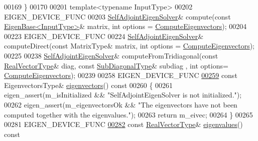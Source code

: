 \begin{DoxyCode}
00169     \}
00170 
00201     \textcolor{keyword}{template}<\textcolor{keyword}{typename} InputType>
00202     EIGEN\_DEVICE\_FUNC
00203     \hyperlink{group___eigenvalues___module_class_eigen_1_1_self_adjoint_eigen_solver}{SelfAdjointEigenSolver}& compute(\textcolor{keyword}{const} 
      \hyperlink{group___core___module_struct_eigen_1_1_eigen_base}{EigenBase<InputType>}& matrix, \textcolor{keywordtype}{int} options = 
      \hyperlink{group__enums_ggae3e239fb70022eb8747994cf5d68b4a9ada93d8885bde32b876ba4af01d3292cc}{ComputeEigenvectors});
00204     
00223     EIGEN\_DEVICE\_FUNC
00224     \hyperlink{group___eigenvalues___module_class_eigen_1_1_self_adjoint_eigen_solver}{SelfAdjointEigenSolver}& computeDirect(\textcolor{keyword}{const} MatrixType& matrix, \textcolor{keywordtype}{int} options = 
      \hyperlink{group__enums_ggae3e239fb70022eb8747994cf5d68b4a9ada93d8885bde32b876ba4af01d3292cc}{ComputeEigenvectors});
00225 
00238     \hyperlink{group___eigenvalues___module_class_eigen_1_1_self_adjoint_eigen_solver}{SelfAdjointEigenSolver}& computeFromTridiagonal(\textcolor{keyword}{const} 
      \hyperlink{class_eigen_1_1internal_1_1_tensor_lazy_evaluator_writable}{RealVectorType}& diag, \textcolor{keyword}{const} \hyperlink{group___core___module_class_eigen_1_1_matrix}{SubDiagonalType}& subdiag , \textcolor{keywordtype}{int} options=
      \hyperlink{group__enums_ggae3e239fb70022eb8747994cf5d68b4a9ada93d8885bde32b876ba4af01d3292cc}{ComputeEigenvectors});
00239 
00258     EIGEN\_DEVICE\_FUNC
\hyperlink{group___eigenvalues___module_a7b9f7e641fa46ac4c5f2371405c69b2b}{00259}     \textcolor{keyword}{const} EigenvectorsType& \hyperlink{group___eigenvalues___module_a7b9f7e641fa46ac4c5f2371405c69b2b}{eigenvectors}()\textcolor{keyword}{ const}
00260 \textcolor{keyword}{    }\{
00261       eigen\_assert(m\_isInitialized && \textcolor{stringliteral}{"SelfAdjointEigenSolver is not initialized."});
00262       eigen\_assert(m\_eigenvectorsOk && \textcolor{stringliteral}{"The eigenvectors have not been computed together with the
       eigenvalues."});
00263       \textcolor{keywordflow}{return} m\_eivec;
00264     \}
00265 
00281     EIGEN\_DEVICE\_FUNC
\hyperlink{group___eigenvalues___module_a8efab27e82aa6aa0ae0c64739238c2e0}{00282}     \textcolor{keyword}{const} \hyperlink{class_eigen_1_1internal_1_1_tensor_lazy_evaluator_writable}{RealVectorType}& \hyperlink{group___eigenvalues___module_a8efab27e82aa6aa0ae0c64739238c2e0}{eigenvalues}()\textcolor{keyword}{ const}

\end{DoxyCode}

